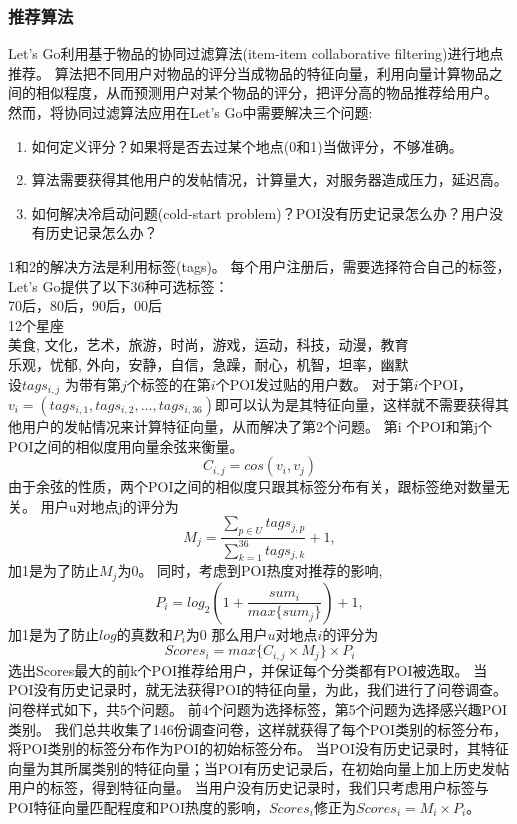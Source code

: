 \documentclass[UTF8]{article}
\begin{document}
\subsubsection{推荐算法}
Let's Go利用基于物品的协同过滤算法(item-item collaborative filtering)进行地点推荐。
算法把不同用户对物品的评分当成物品的特征向量，利用向量计算物品之间的相似程度，从而预测用户对某个物品的评分，把评分高的物品推荐给用户。
然而，将协同过滤算法应用在Let's Go中需要解决三个问题:
\begin{enumerate}
    \item 如何定义评分？如果将是否去过某个地点(0和1)当做评分，不够准确。
    \item 算法需要获得其他用户的发帖情况，计算量大，对服务器造成压力，延迟高。
    \item 如何解决冷启动问题(cold-start problem)？POI没有历史记录怎么办？用户没有历史记录怎么办？
\end{enumerate}
1和2的解决方法是利用标签(tags)。
每个用户注册后，需要选择符合自己的标签，Let’s Go提供了以下36种可选标签：\\
70后，80后，90后，00后\\
12个星座\\
美食, 文化，艺术，旅游，时尚，游戏，运动，科技，动漫，教育\\
乐观，忧郁, 外向，安静，自信，急躁，耐心，机智，坦率，幽默\\
设$tags_{i,j}$ 为带有第$j$个标签的在第$i$个POI发过贴的用户数。
对于第$i$个POI，$v_i=(tags_{i,1},tags_{i,2},  …  ,tags_{i,36})$即可以认为是其特征向量，这样就不需要获得其他用户的发帖情况来计算特征向量，从而解决了第2个问题。
第i 个POI和第j个POI之间的相似度用向量余弦来衡量。
\[C_{i,j}=cos(v_i,v_j)\]
由于余弦的性质，两个POI之间的相似度只跟其标签分布有关，跟标签绝对数量无关。
用户u对地点j的评分为
\[M_j=\frac{\sum_{p\in U}tags_{j,p}}{\sum_{k=1}^{36}tags_{j,k}}+1,\]
加1是为了防止$M_j$为0。
同时，考虑到POI热度对推荐的影响,
\[P_i=log_2(1+\frac{sum_i}{max\{sum_j\}})+1,\]
加1是为了防止$log$的真数和$P_i$为0
那么用户$u$对地点$i$的评分为
\[Scores_i=max\{C_{i,j} \times M_j\} \times P_i\]
选出Scores最大的前k个POI推荐给用户，并保证每个分类都有POI被选取。
当POI没有历史记录时，就无法获得POI的特征向量，为此，我们进行了问卷调查。
问卷样式如下，共5个问题。
前4个问题为选择标签，第5个问题为选择感兴趣POI类别。
我们总共收集了146份调查问卷，这样就获得了每个POI类别的标签分布，将POI类别的标签分布作为POI的初始标签分布。
当POI没有历史记录时，其特征向量为其所属类别的特征向量；当POI有历史记录后，在初始向量上加上历史发帖用户的标签，得到特征向量。
当用户没有历史记录时，我们只考虑用户标签与POI特征向量匹配程度和POI热度的影响，$Scores_i$修正为$Scores_i=M_i \times P_i$。
\end{document}
